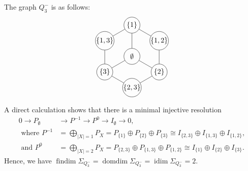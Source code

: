 \documentclass[a4paper,leqno]{amsart}
\begin{document}
\begin{eg}\label{ex:hy-cube-d=2}
The graph $Q_3^{-}$ is as follows:
$$\begin{tikzpicture}[
scale=0.6,
    every node/.style={
        circle,
        draw,
        minimum size=8mm,
        inner sep=0pt
    }
]
\node (empty) at (0,0)       {$\emptyset$};
\node (one)   at (0,2.6)     {$\{1\}$};
\node (onetwo) at (2.25,1.3) {$\{1,2\}$};
\node (two)   at (2.25,-1.3) {$\{2\}$};
\node (twothree) at (0,-2.6) {$\{2,3\}$};
\node (three) at (-2.25,-1.3) {$\{3\}$};
\node (onethree) at (-2.25,1.3) {$\{1,3\}$};

\draw (one) -- (onetwo);
\draw (onetwo) -- (two);
\draw (two) -- (twothree);
\draw (twothree) -- (three);
\draw (three) -- (onethree);
\draw (onethree) -- (one);

\draw (empty) -- (one);
\draw (empty) -- (two);
\draw (empty) -- (three);
\end{tikzpicture}$$
A direct calculation shows that there is a minimal injective resolution
\begin{align*}
 0\longrightarrow  P_{\emptyset} & \longrightarrow P^{-1} \longrightarrow P^0 \longrightarrow I_{\emptyset} \longrightarrow 0,\\
\text{ where }  P^{-1} & = \bigoplus_{|X|=1} P_X = P_{\{1\}}\oplus P_{\{2\}}\oplus P_{\{3\}} \cong  I_{\{2,3\}}\oplus I_{\{1,3\}}\oplus I_{\{1,2\}}, \\
\text{ and } {P^0} & = \bigoplus_{|X|=2} P_X = P_{\{2,3\}}\oplus P_{\{1,3\}}\oplus P_{\{1,2\}} \cong I_{\{1\}}\oplus I_{\{2\}}\oplus I_{\{3\}}. 
\end{align*}
Hence, we have
$\operatorname{findim}\Sigma_{Q_3^{-}}
=
\operatorname{domdim}\Sigma_{Q_3^{-}}
=
\operatorname{idim}\Sigma_{Q_3^{-}}
=
2.$
\end{eg}
\end{document}
